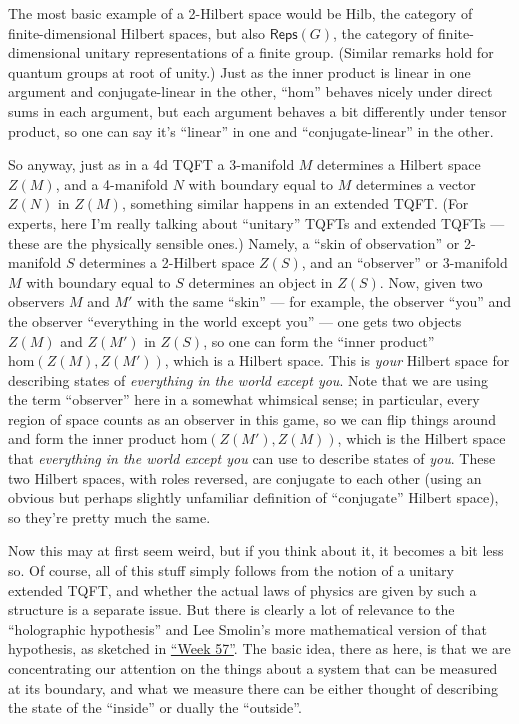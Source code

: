 \documentclass{article}
\begin{document}
The most basic example of a 2-Hilbert space would be Hilb, the category
of finite-dimensional Hilbert spaces, but also \(\mathsf{Reps}(G)\), the
category of finite-dimensional unitary representations of a finite
group. (Similar remarks hold for quantum groups at root of unity.) Just
as the inner product is linear in one argument and conjugate-linear in
the other, ``\(\mathrm{hom}\)'' behaves nicely under direct sums in each
argument, but each argument behaves a bit differently under tensor
product, so one can say it's ``linear'' in one and ``conjugate-linear''
in the other.

So anyway, just as in a 4d TQFT a 3-manifold \(M\) determines a Hilbert
space \(Z(M)\), and a 4-manifold \(N\) with boundary equal to \(M\)
determines a vector \(Z(N)\) in \(Z(M)\), something similar happens in
an extended TQFT. (For experts, here I'm really talking about
``unitary'' TQFTs and extended TQFTs --- these are the physically
sensible ones.) Namely, a ``skin of observation'' or 2-manifold \(S\)
determines a 2-Hilbert space \(Z(S)\), and an ``observer'' or 3-manifold
\(M\) with boundary equal to \(S\) determines an object in \(Z(S)\).
Now, given two observers \(M\) and \(M'\) with the same ``skin'' --- for
example, the observer ``you'' and the observer ``everything in the world
except you'' --- one gets two objects \(Z(M)\) and \(Z(M')\) in
\(Z(S)\), so one can form the ``inner product''
\(\mathrm{hom}(Z(M),Z(M'))\), which is a Hilbert space. This is
\emph{your} Hilbert space for describing states of \emph{everything in
the world except you}. Note that we are using the term ``observer'' here
in a somewhat whimsical sense; in particular, every region of space
counts as an observer in this game, so we can flip things around and
form the inner product \(\mathrm{hom}(Z(M'),Z(M))\), which is the
Hilbert space that \emph{everything in the world except you} can use to
describe states of \emph{you}. These two Hilbert spaces, with roles
reversed, are conjugate to each other (using an obvious but perhaps
slightly unfamiliar definition of ``conjugate'' Hilbert space), so
they're pretty much the same.

Now this may at first seem weird, but if you think about it, it becomes
a bit less so. Of course, all of this stuff simply follows from the
notion of a unitary extended TQFT, and whether the actual laws of
physics are given by such a structure is a separate issue. But there is
clearly a lot of relevance to the ``holographic hypothesis'' and Lee
Smolin's more mathematical version of that hypothesis, as sketched in
\protect\hyperlink{week57}{``Week 57''}. The basic idea, there as here,
is that we are concentrating our attention on the things about a system
that can be measured at its boundary, and what we measure there can be
either thought of describing the state of the ``inside'' or dually the
``outside''.
\end{document}
